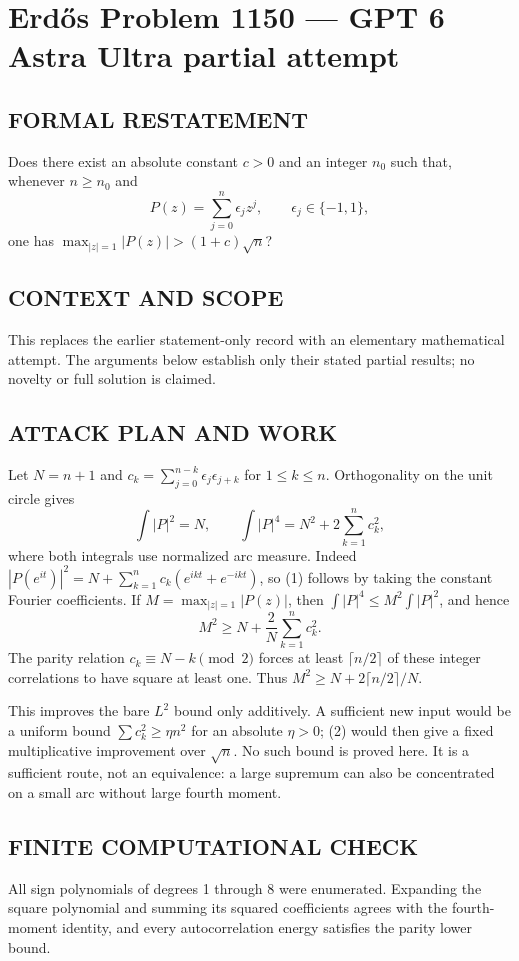 \section*{Erd\H{o}s Problem 1150 --- GPT 6 Astra Ultra partial attempt}


\subsection*{FORMAL RESTATEMENT}
Does there exist an absolute constant $c>0$ and an integer $n_0$ such that, whenever $n\geq n_0$ and
\[
P(z)=\sum_{j=0}^n\epsilon_jz^j,\qquad \epsilon_j\in\{-1,1\},
\]
one has $\max_{|z|=1}|P(z)|>(1+c)\sqrt n$?

\subsection*{CONTEXT AND SCOPE}
This replaces the earlier statement-only record with an elementary mathematical attempt. The arguments below establish only their stated partial results; no novelty or full solution is claimed.

\subsection*{ATTACK PLAN AND WORK}
Let $N=n+1$ and $c_k=\sum_{j=0}^{n-k}\epsilon_j\epsilon_{j+k}$ for $1\le k\le n$.
Orthogonality on the unit circle gives
\[
\int |P|^2=N,\qquad \int |P|^4=N^2+2\sum_{k=1}^n c_k^2,
\tag{1}
\]
where both integrals use normalized arc measure. Indeed
$|P(e^{it})|^2=N+\sum_{k=1}^n c_k(e^{ikt}+e^{-ikt})$, so (1) follows by taking
the constant Fourier coefficients. If $M=\max_{|z|=1}|P(z)|$, then
$\int|P|^4\le M^2\int|P|^2$, and hence
\[M^2\ge N+\frac2N\sum_{k=1}^n c_k^2.\tag{2}\]
The parity relation $c_k\equiv N-k\pmod2$ forces at least $\lceil n/2\rceil$
of these integer correlations to have square at least one. Thus
$M^2\ge N+2\lceil n/2\rceil/N$.

This improves the bare $L^2$ bound only additively. A sufficient new input would
be a uniform bound $\sum c_k^2\ge\eta n^2$ for an absolute $\eta>0$;
(2) would then give a fixed multiplicative improvement over $\sqrt n$.
No such bound is proved here. It is a sufficient route, not an equivalence:
a large supremum can also be concentrated on a small arc without large fourth moment.

\subsection*{FINITE COMPUTATIONAL CHECK}
All sign polynomials of degrees 1 through 8 were enumerated. Expanding the square polynomial and summing its squared coefficients agrees with the fourth-moment identity, and every autocorrelation energy satisfies the parity lower bound.

